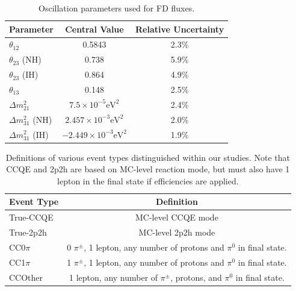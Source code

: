 \documentclass[12pt]{article}
\begin{document}
\begin{table}
\centering
 \begin{tabular}{| l  c  c |} 
 \hline 
 Parameter & Central Value & Relative Uncertainty\\ [0.5ex] 
 \hline
 $\theta_{12}$ & 0.5843 & 2.3\% \\ 
 $\theta_{23}$ (NH) & 0.738 & 5.9\% \\
 $\theta_{23}$ (IH) & 0.864 & 4.9\% \\
 $\theta_{13}$ & 0.148 & 2.5\% \\ 
 $\Delta m^2_{21}$ & $7.5\times10^{-5} \textrm{eV}^2$ & 2.4\% \\
 $\Delta m^2_{31}$ (NH) & $2.457\times10^{-3} \textrm{eV}^2$ & 2.0\% \\
 $\Delta m^2_{31}$ (IH) & $-2.449\times10^{-3} \textrm{eV}^2$ & 1.9\% \\[1ex]
 \hline
\end{tabular}
\caption{Oscillation parameters used for FD fluxes.}
\label{tab:osc}
\end{table}

\begin{table}
\centering
 \begin{tabular}{| l  c  |} 
 \hline 
 Event Type & Definition\\ [0.5ex] 
 \hline
 True-CCQE & MC-level CCQE mode \\ 
 True-2p2h & MC-level 2p2h mode \\
 CC0$\pi$ & 0 $\pi^{\pm}$, 1 lepton, any number of protons and $\pi^0$ in final state. \\
 CC1$\pi$ & 1 $\pi^{\pm}$, 1 lepton, any number of protons and $\pi^0$ in final state. \\
 CCOther & 1 lepton, any number of $\pi^{\pm}$, protons, and $\pi^0$ in final state. \\ [1ex]
 \hline
\end{tabular}
\caption{Definitions of various event types distinguished within our studies. Note that CCQE and 2p2h are based on MC-level reaction mode, but must also have 1 lepton in the final state if efficiencies are applied.}
\label{tab:events}
\end{table}


\FloatBarrier
\end{document}
